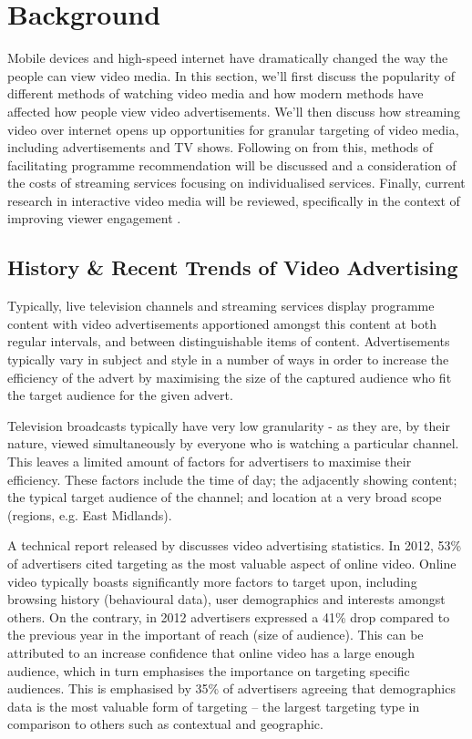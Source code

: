 \section{Background}

Mobile devices and high-speed internet have dramatically changed the way the people can view video media. In this section, we'll first discuss the popularity of different methods of watching video media and how modern methods have affected how people view video advertisements. We'll then discuss how streaming video over internet opens up opportunities for granular targeting of video media, including advertisements and TV shows. Following on from this, methods of facilitating programme recommendation will be discussed and a consideration of the costs of streaming services focusing on individualised services. Finally, current research in interactive video media will be reviewed, specifically in the context of improving viewer engagement \cite{what_is_engagement}.

\subsection{History \& Recent Trends of Video Advertising}

	Typically, live television channels and streaming services display programme content with video advertisements apportioned amongst this content at both regular intervals, and between distinguishable items of content. Advertisements typically vary in subject and style in a number of ways in order to increase the efficiency of the advert by maximising the size of the captured audience who fit the target audience for the given advert.

	Television broadcasts typically have very low granularity - as they are, by their nature, viewed simultaneously by everyone who is watching a particular channel. This leaves a limited amount of factors for advertisers to maximise their efficiency. These factors include the time of day; the adjacently showing content; the typical target audience of the channel; and location at a very broad scope (regions, e.g. East Midlands).

	A technical report released by \citet{brightroll-report} discusses video advertising statistics. In 2012, 53\% of advertisers cited targeting as the most valuable aspect of online video. Online video typically boasts significantly more factors to target upon, including browsing history (behavioural data), user demographics and interests amongst others. On the contrary, in 2012 advertisers expressed a 41\% drop compared to the previous year in the important of reach (size of audience). This can be attributed to an increase confidence that online video has a large enough audience, which in turn emphasises the importance on targeting specific audiences. This is emphasised by 35\% of advertisers agreeing that demographics data is the most valuable form of targeting -- the largest targeting type in comparison to others such as contextual and geographic.

